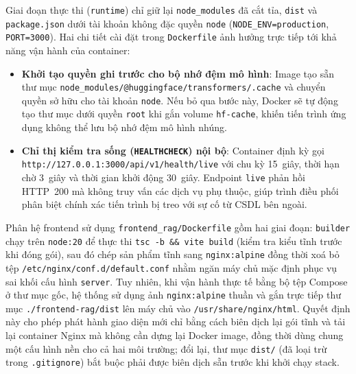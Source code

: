 Giai đoạn thực thi (\texttt{runtime}) chỉ giữ lại \texttt{node\_\allowbreak{}modules} đã cắt tỉa, \texttt{dist} và \texttt{package.\allowbreak{}json} dưới tài khoản không đặc quyền \texttt{node} (\texttt{NODE\_\allowbreak{}ENV=\allowbreak{}production}, \texttt{PORT=\allowbreak{}3000}). Hai chi tiết cài đặt trong \texttt{Dockerfile} ảnh hưởng trực tiếp tới khả năng vận hành của container:
\begin{itemize}[label=--]
    \item \textbf{Khởi tạo quyền ghi trước cho bộ nhớ đệm mô hình}: Image tạo sẵn thư mục \texttt{node\_\allowbreak{}modules/\allowbreak{}@\allowbreak{}huggingface/\allowbreak{}transformers/\allowbreak{}.\allowbreak{}cache} và chuyển quyền sở hữu cho tài khoản \texttt{node}. Nếu bỏ qua bước này, Docker sẽ tự động tạo thư mục dưới quyền \texttt{root} khi gắn volume \texttt{hf-\allowbreak{}cache}, khiến tiến trình ứng dụng không thể lưu bộ nhớ đệm mô hình nhúng.
    \item \textbf{Chỉ thị kiểm tra sống (\texttt{HEALTHCHECK}) nội bộ}: Container định kỳ gọi \texttt{http:\allowbreak{}/\allowbreak{}/\allowbreak{}127.\allowbreak{}0.\allowbreak{}0.\allowbreak{}1:\allowbreak{}3000/\allowbreak{}api/\allowbreak{}v1/\allowbreak{}health/\allowbreak{}live} với chu kỳ 15~giây, thời hạn chờ 3~giây và thời gian khởi động 30~giây. Endpoint \texttt{live} phản hồi HTTP~200 mà không truy vấn các dịch vụ phụ thuộc, giúp trình điều phối phân biệt chính xác tiến trình bị treo với sự cố từ CSDL bên ngoài.
\end{itemize}

Phân hệ frontend sử dụng \texttt{frontend\_\allowbreak{}rag/\allowbreak{}Dockerfile} gồm hai giai đoạn: \texttt{builder} chạy trên \texttt{node:\allowbreak{}20} để thực thi \texttt{tsc -\allowbreak{}b \&\& vite build} (kiểm tra kiểu tĩnh trước khi đóng gói), sau đó chép sản phẩm tĩnh sang \texttt{nginx:\allowbreak{}alpine} đồng thời xoá bỏ tệp \texttt{/\allowbreak{}etc/\allowbreak{}nginx/\allowbreak{}conf.\allowbreak{}d/\allowbreak{}default.\allowbreak{}conf} nhằm ngăn máy chủ mặc định phục vụ sai khối cấu hình \texttt{server}. Tuy nhiên, khi vận hành thực tế bằng bộ tệp Compose ở thư mục gốc, hệ thống sử dụng ảnh \texttt{nginx:\allowbreak{}alpine} thuần và gắn trực tiếp thư mục \texttt{.\allowbreak{}/\allowbreak{}frontend-\allowbreak{}rag/\allowbreak{}dist} lên máy chủ vào \texttt{/\allowbreak{}usr/\allowbreak{}share/\allowbreak{}nginx/\allowbreak{}html}. Quyết định này cho phép phát hành giao diện mới chỉ bằng cách biên dịch lại gói tĩnh và tải lại container Nginx mà không cần dựng lại Docker image, đồng thời dùng chung một cấu hình nền cho cả hai môi trường; đổi lại, thư mục \texttt{dist/\allowbreak{}} (đã loại trừ trong \texttt{.\allowbreak{}gitignore}) bắt buộc phải được biên dịch sẵn trước khi khởi chạy stack.

